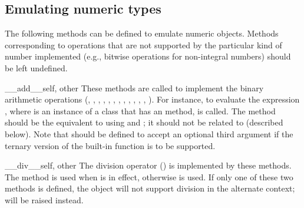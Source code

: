 \subsection{Emulating numeric types\label{numeric-types}}

The following methods can be defined to emulate numeric objects.
Methods corresponding to operations that are not supported by the
particular kind of number implemented (e.g., bitwise operations for
non-integral numbers) should be left undefined.

\begin{methoddesc}{__add__}{self, other}
These methods are
called to implement the binary arithmetic operations (\code{+},
\code{-}, \code{*}, \code{//}, \code{\%},
,
, \code{**}, \code{<}\code{<},
\code{>}\code{>}, \code{\&}, \code{\^}, \code{|}).  For instance, to
evaluate the expression \code{+}, where  is an
instance of a class that has an  method,
 is called.  The 
method should be the equivalent to using  and
; it should not be related to 
(described below).  Note that
 should be defined to accept an optional third
argument if the ternary version of the built-in
 function is to be supported.
\end{methoddesc}

\begin{methoddesc}{__div__}{self, other}
The division operator (\code{/}) is implemented by these methods.  The
 method is used when 
is in effect, otherwise  is used.  If only one of
these two methods is defined, the object will not support division in
the alternate context;  will be raised instead.
\end{methoddesc}

